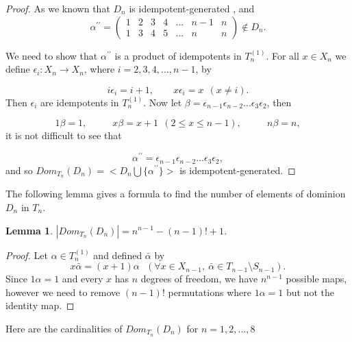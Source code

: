 \documentclass[10pt]{extarticle}
\numberwithin{equation}{section}
\numberwithin{bbb}{section}
\newtheorem{lemma}{Lemma}[section]
\numberwithin{equation}{section}
\begin{document}
\begin{proof}
  As we known that $D_n$ is idempotent-generated \cite{15},
and 
\vspace{0.5cm}
$$\alpha^{\prime\prime}=
\begin{pmatrix}  
1&2&3&4&...&n-1&n\\1&3&4&5&...&n&n
\end{pmatrix} \notin D_n.$$

 We need to show that $\alpha^{\prime\prime}$ is a product of idempotents in $T_n^{(1)}.$ For all $x \in X_n$ we define $\epsilon_{i}: X_n \rightarrow X_n$, where $i=2,3,4,...,n-1$, by
 
$$ i\epsilon_{i}=i+1, \ \ \ \ \ \ \ \ \ x\epsilon_{i}=x \ \ (x \neq i).$$
Then $\epsilon_{i}$ are idempotents in $T_n^{(1)}$. Now let $\beta=\epsilon_{n-1}\epsilon_{n-2}...\epsilon_{3}\epsilon_{2}$, then

$$1\beta=1, \ \ \ \ \ \ \ \ \  \ \ \ x\beta=x+1 \ \ (2 \leq x \leq n-1), \ \ \ \ \ \ \ \ \ \ \ \ n\beta=n,$$
it is not difficult to see that

$$\alpha^{\prime\prime}=\epsilon_{n-1}\epsilon_{n-2}...\epsilon_{3}\epsilon_{2},$$
and so $Dom_{T_n}(D_n)=<D_n \bigcup \{{\alpha^{\prime\prime}}\}>$ is idempotent-generated.
\end{proof}

\vspace{0.5cm}
The following lemma gives a formula to find the number of elements of dominion $D_n$ in $T_n$.

\vspace{0.2cm}
\begin{lemma}  
$|Dom_{T_n}(D_n)|= n^{n-1}-(n-1)!+1$.
\end{lemma}

\begin{proof}
    Let $\alpha \in T_n^{(1)}$ and defined $\bar{\alpha}$ by 
    $$x\bar{\alpha}=(x+1)\alpha \ \ \ (\forall x \in X_{n-1}, \ \bar{\alpha} \in T_{n-1} \setminus S_{n-1}).$$
    Since $1\alpha=1$ and every $x$ has $n$ degrees of freedom, we have $n^{n-1}$ possible maps, however we need to remove $(n-1)!$ permutations where $1\alpha=1$ but not the identity map.
\end{proof}


Here are the cardinalities of $Dom_{T_n}(D_n)$ for $n=1,2,...,8$
\end{document}
